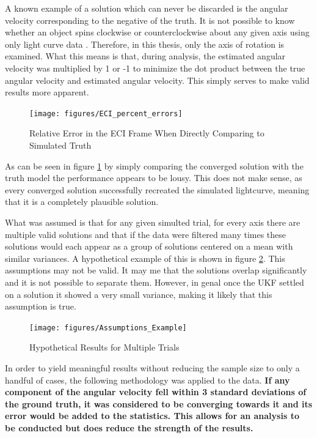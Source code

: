 A known example of a solution which can never be discarded is the angular velocity corresponding to the negative of the truth. It is not possible to know whether an object spins clockwise or counterclockwise about any given axis using only light curve data \cite{Spin_Direction}. Therefore, in this thesis, only the axis of rotation is examined. What this means is that, during analysis, the estimated angular velocity was multiplied by 1 or -1 to minimize the dot product between the true angular velocity and estimated angular velocity. This simply serves to make valid results more apparent.

\begin{figure}[ht]\label{awful_errors}
	\begin{center}
		\texttt{[image: figures/ECI\_percent\_errors]}
		\caption{Relative Error in the ECI Frame When Directly Comparing to Simulated Truth}
	\end{center}
\end{figure}

As can be seen in figure \ref{awful_errors} by simply comparing the converged solution with the truth model the performance appears to be lousy. This does not make sense, as every converged solution successfully recreated the simulated lightcurve, meaning that it is a completely plausible solution.

What was assumed is that for any given simulted trial, for every axis there are multiple valid solutions and that if the data were filtered many times these solutions would each appear as a group of solutions centered on a mean with similar variances. A hypothetical example of this is shown in figure \ref{distributions}. This assumptions may not be valid. It may me that the solutions overlap significantly and it is not possible to separate them. However, in genal once the UKF settled on a solution it showed a very small variance, making it likely that this assumption is true.

\begin{figure}[ht]\label{distributions}
	\begin{center}
		\texttt{[image: figures/Assumptions\_Example]}
		\caption{Hypothetical Results for Multiple Trials}
	\end{center}
\end{figure}

In order to yield meaningful results without reducing the sample size to only a handful of cases, the following methodology was applied to the data. \textbf{If any component of the angular velocity fell within 3 standard deviations of the ground truth, it was considered to be converging towards it and its error would be added to the statistics. This allows for an analysis to be conducted but does reduce the strength of the results.}

